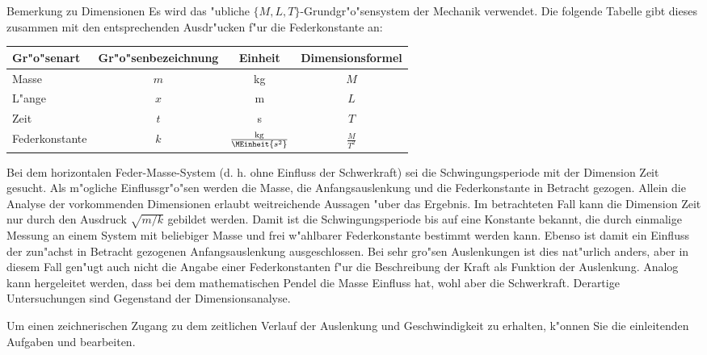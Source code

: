 \begin{MIntro}
\begin{MHint}{Bemerkung zu Dimensionen}
    Es wird das "ubliche $\{M, L, T\}$-Grundgr"o"sensystem der Mechanik verwendet. Die folgende Tabelle gibt dieses zusammen mit den entsprechenden Ausdr"ucken f"ur die Federkonstante an:

    \begin{tabular}{|l|c|c|c|}
    \hline
    Gr"o"senart    & Gr"o"senbezeichnung & Einheit & Dimensionsformel \\\hline
    Masse          & $m$                 & kg      & $M$              \\\hline
    L"ange         & $x$                 & m       & $L$              \\\hline
    Zeit           & $t$                 & s       & $T$              \\\hline
    Federkonstante & $k$                 & $\frac{\mse{kg}}{\MEinheit{s^2}}$ & $\frac{M}{T^2}$\\\hline
    \end{tabular}
    
  Bei dem horizontalen Feder-Masse-System (d. h. ohne Einfluss der Schwerkraft) sei die Schwingungsperiode mit der Dimension Zeit gesucht.
  Als m"ogliche Einflussgr"o"sen werden die Masse, die Anfangsauslenkung und die Federkonstante in Betracht gezogen.
  Allein die Analyse der vorkommenden Dimensionen erlaubt weitreichende Aussagen "uber das Ergebnis.
  Im betrachteten Fall kann die Dimension Zeit nur durch den Ausdruck $\sqrt{m/k}$ gebildet werden.
  Damit ist die Schwingungsperiode bis auf eine Konstante bekannt, die durch einmalige Messung an einem
  System mit beliebiger Masse und frei w"ahlbarer Federkonstante bestimmt werden kann.
  Ebenso ist damit ein Einfluss der zun"achst in Betracht gezogenen Anfangsauslenkung ausgeschlossen.
  Bei sehr gro"sen Auslenkungen ist dies nat"urlich anders, aber in diesem Fall gen"ugt auch nicht
  die Angabe einer Federkonstanten f"ur die Beschreibung der Kraft als Funktion der Auslenkung.
  Analog kann hergeleitet werden, dass bei dem mathematischen Pendel die Masse  Einfluss hat,
  wohl aber die Schwerkraft. Derartige Untersuchungen sind Gegenstand der Dimensionsanalyse.

  \end{MHint}

Um einen zeichnerischen Zugang zu dem zeitlichen Verlauf der Auslenkung und Geschwindigkeit zu erhalten, k"onnen Sie die einleitenden Aufgaben 
und 
bearbeiten.


\end{MIntro}


